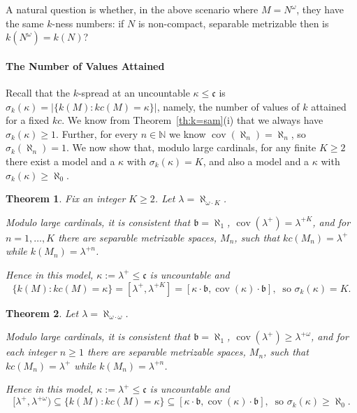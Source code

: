 \documentclass{article}
\newtheorem{thm}{Theorem}[section]
\begin{document}
A natural question is whether, in the above scenario where $M=N^\omega$, they have the same $k$-ness numbers: if $N$ is non-compact, separable metrizable then is $k(N^\omega)=k(N)$? 

\paragraph{The Number of Values Attained}

Recall that the $k$-spread at an uncountable $\kappa\le \mathfrak{c}$ is $\sigma_k(\kappa)=|\{k(M) : kc(M)=\kappa\}|$, namely, the number of values of $k$ attained for a fixed $kc$. We know from Theorem~\ref{th:k=sam}(i) that we always have $\sigma_k(\kappa) \ge 1$. 
Further, for every $n\in \mathbb{N}$ we know $\mathop{cov}(\aleph_n)=\aleph_n$, so $\sigma_k(\aleph_n)=1$. We now show that, modulo large cardinals, for any finite $K\ge 2$ there exist a model and a $\kappa$ with $\sigma_k(\kappa)=K$, and also a model and a $\kappa$ with $\sigma_k(\kappa)\ge\aleph_0$.

\begin{thm}\label{th:K_many}
Fix an integer $K\ge 2$. 
Let $\lambda=\aleph_{\omega\cdot K}$. 

Modulo large cardinals, it is consistent that $\mathfrak{b}=\aleph_1$, 
$\mathop{cov}(\lambda^+)=\lambda^{+K}$, and  
for $n=1,\ldots,K$ there are separable metrizable spaces, $M_n$, such that $kc(M_n)=\lambda^+$ while $k(M_n)=\lambda^{+n}$.

Hence in this model, $\kappa:=\lambda^+ \le \mathfrak{c}$ is uncountable and
\[\{k(M):kc(M)=\kappa\}=
[\lambda^+,\lambda^{+K}]=
[\kappa\cdot\mathfrak{b},\mathop{cov}(\kappa)\cdot\mathfrak{b}], \ \text{  so }\sigma_k(\kappa)=K.\] 
\end{thm}

\begin{thm}\label{th:ctbl_many}
Let $\lambda=\aleph_{\omega\cdot\omega}$. 

Modulo large cardinals, it is consistent that $\mathfrak{b}=\aleph_1$, 
$\mathop{cov}(\lambda^+)\ge\lambda^{+\omega}$, and  
for each integer $n\ge 1$ there are separable metrizable spaces, $M_n$, such that $kc(M_n)=\lambda^+$ while $k(M_n)=\lambda^{+n}$.

Hence in this model,  $\kappa:=\lambda^+ \le \mathfrak{c}$ is uncountable and
\[ [\lambda^+,\lambda^{+\omega})
\subseteq  \{k(M):kc(M)=\kappa\} \subseteq 
[\kappa\cdot\mathfrak{b},\mathop{cov}(\kappa)\cdot\mathfrak{b}], \ \text{  so }\sigma_k(\kappa)\ge\aleph_0.\] 
\end{thm}
\end{document}
